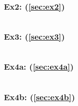 \documentclass[12pt]{article}
\begin{document}
\subsubsection{Ex2: (\ref{sec:ex2})}\label{appendix:ex2}
\inputminted{matlab}{matlab/ex2.m}

\subsubsection{Ex3: (\ref{sec:ex3})}\label{appendix:ex3}
\inputminted{matlab}{matlab/ex3.m}

\subsubsection{Ex4a: (\ref{sec:ex4a})}\label{appendix:ex4a}
\inputminted{matlab}{matlab/ex4a.m}

\subsubsection{Ex4b: (\ref{sec:ex4b})}\label{appendix:ex4b}
\inputminted{matlab}{matlab/ex4b.m}

\end{document}
